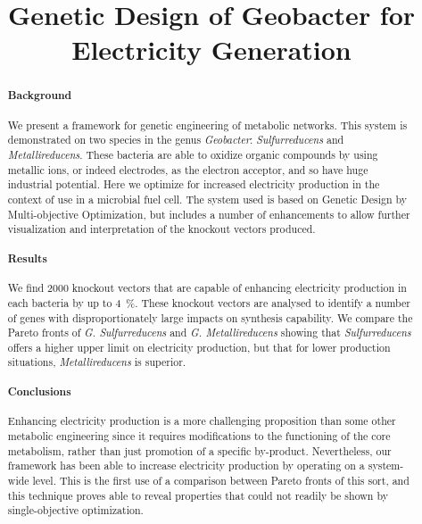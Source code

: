 \documentclass[a4paper,twocolumn]{article}
\begin{document}
\title{Genetic Design of Geobacter for Electricity Generation}
\maketitle
\begin{abstract}

\paragraph{Background}
We present a framework for genetic engineering of metabolic networks. This system is demonstrated on two species in the genus {\it Geobacter}: {\it Sulfurreducens} and {\it Metallireducens}. These bacteria are able to oxidize organic compounds by using metallic ions, or indeed electrodes, as the electron acceptor, and so have huge industrial potential. Here we optimize for increased electricity production in the context of use in a microbial fuel cell. The system used is based on Genetic Design by Multi-objective Optimization, but includes a number of enhancements to allow further visualization and interpretation of the knockout vectors produced.
\paragraph{Results}
We find 2000 knockout vectors that are capable of enhancing electricity production in each bacteria by up to \SI{4}{\percent}. These knockout vectors are analysed to identify a number of genes with disproportionately large impacts on synthesis capability. We compare the Pareto fronts of {\it G. Sulfurreducens} and {\it G. Metallireducens} showing that {\it Sulfurreducens} offers a higher upper limit on electricity production, but that for lower production situations, {\it Metallireducens} is superior.
\paragraph{Conclusions}
Enhancing electricity production is a more challenging proposition than some other metabolic engineering since it requires modifications to the functioning of the core metabolism, rather than just promotion of a specific by-product. Nevertheless, our framework has been able to increase electricity production by operating on a system-wide level. This is the first use of a comparison between Pareto fronts of this sort, and this technique proves able to reveal properties that could not readily be shown by single-objective optimization.

\end{abstract}
\end{document}
